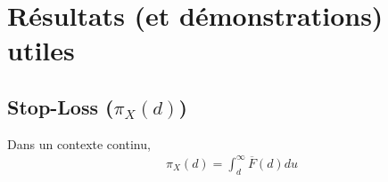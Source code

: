 \chapter{Résultats (et démonstrations) utiles}

\section{Stop-Loss ($\pi_X(d)$)}
\label{preuve:stoploss}
Dans un contexte continu,
\begin{align*}
\pi_X(d) = \int_d^\infty \overline{F}(d) du
\end{align*}


